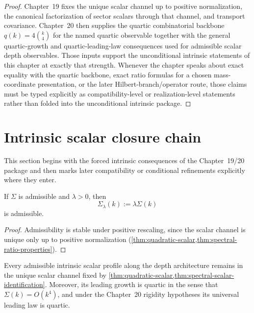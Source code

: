\begin{proof}
Chapter~19 fixes the unique scalar channel up to positive
normalization, the canonical factorization of sector scalars through
that channel, and transport covariance.
Chapter~20 then supplies the quartic combinatorial backbone
\(q(k)=4\binom{k}{4}\) for the named quartic observable together with
the general quartic-growth and quartic-leading-law consequences used
for admissible scalar depth observables.
Those inputs support the unconditional intrinsic statements of this
chapter at exactly that strength.
Whenever the chapter speaks about exact equality with the quartic
backbone, exact ratio formulas for a chosen mass-coordinate
presentation, or the later Hilbert-branch/operator route, those claims
must be typed explicitly as compatibility-level or realization-level
statements rather than folded into the unconditional intrinsic
package.
\end{proof}

\section{Intrinsic scalar closure chain}
\label{sec:shell-intrinsic-closure}

This section begins with the forced intrinsic consequences of the
Chapter~19/20 package and then marks later compatibility or
conditional refinements explicitly where they enter.

\begin{proposition}
\label{prop:scaling}
If \(\Sigma\) is admissible and \(\lambda>0\), then
\[
  \Sigma_\lambda(k):=\lambda\Sigma(k)
\]
is admissible.
\end{proposition}

\begin{proof}
Admissibility is stable under positive rescaling, since the scalar channel
is unique only up to positive normalization
(\cref{thm:quadratic-scalar,thm:spectral-ratio-properties}).
\end{proof}

\begin{theorem}
\label{thm:closure}
Every admissible intrinsic scalar profile along the depth architecture
remains in the unique scalar channel fixed by
\cref{thm:quadratic-scalar,thm:spectral-scalar-identification}.
Moreover, its leading growth is quartic in the sense that
\(\Sigma(k)=O(k^4)\), and under the Chapter~20 rigidity hypotheses its
universal leading law is quartic.
\end{theorem}

